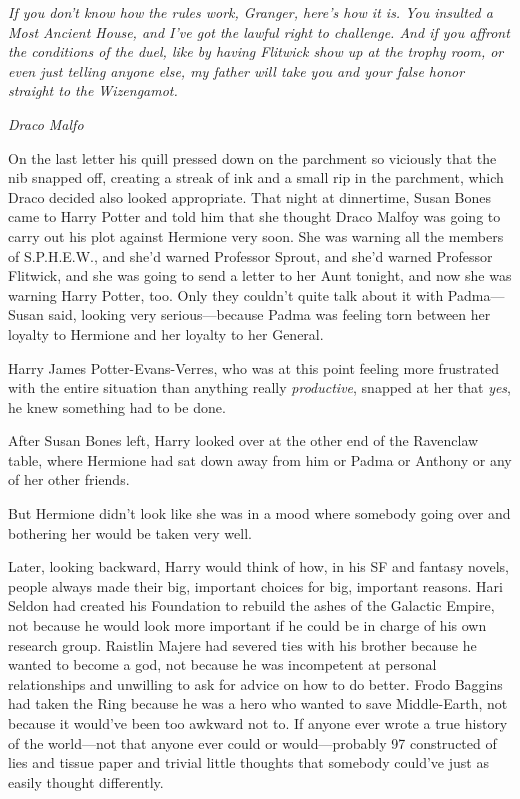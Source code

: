 \emph{If you don't know how the rules work, Granger, here's how it is. You 
insulted a Most Ancient House, and I've got the lawful right to challenge. And 
if you affront the conditions of the duel, like by having Flitwick show up at 
the trophy room, or even just telling anyone else, my father will take you and 
your false honor straight to the Wizengamot.}

\emph{Draco Malfo}

On the last letter his quill pressed down on the parchment so viciously that 
the nib snapped off, creating a streak of ink and a small rip in the parchment, 
which Draco decided also looked appropriate.
\sbreak
That night at dinnertime, Susan Bones came to Harry Potter and told him that 
she thought Draco Malfoy was going to carry out his plot against Hermione very 
soon. She was warning all the members of S.P.H.E.W., and she'd warned Professor 
Sprout, and she'd warned Professor Flitwick, and she was going to send a letter 
to her Aunt tonight, and now she was warning Harry Potter, too. Only they 
couldn't quite talk about it with Padma---Susan said, looking very 
serious---because Padma was feeling torn between her loyalty to Hermione and 
her loyalty to her General.

Harry James Potter-Evans-Verres, who was at this point feeling more frustrated 
with the entire situation than anything really \emph{productive}, snapped at 
her that \emph{yes}, he knew something had to be done.

After Susan Bones left, Harry looked over at the other end of the Ravenclaw 
table, where Hermione had sat down away from him or Padma or Anthony or any of 
her other friends.

But Hermione didn't look like she was in a mood where somebody going over and 
bothering her would be taken very well.

Later, looking backward, Harry would think of how, in his SF and fantasy 
novels, people always made their big, important choices for big, important 
reasons. Hari Seldon had created his Foundation to rebuild the ashes of the 
Galactic Empire, not because he would look more important if he could be in 
charge of his own research group. Raistlin Majere had severed ties with his 
brother because he wanted to become a god, not because he was incompetent at 
personal relationships and unwilling to ask for advice on how to do better. 
Frodo Baggins had taken the Ring because he was a hero who wanted to save 
Middle-Earth, not because it would've been too awkward not to. If anyone ever 
wrote a true history of the world---not that anyone ever could or 
would---probably 97%
constructed of lies and tissue paper and trivial little thoughts that somebody 
could've just as easily thought differently.

